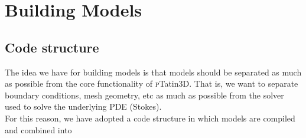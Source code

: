 \documentclass[paper=a4, fontsize=11pt,twoside]{scrartcl}
\newcommand{\ptat}{{{\textsc pTatin3D}}}
\begin{document}
\newpage
\section{Building Models}

\subsection{Code structure}
The idea we have for building models is that models should be separated as much as possible
from the core functionality of {\ptat}. That is, we want to separate boundary conditions,
mesh geometry, etc as much as possible from the solver used to solve the underlying PDE (Stokes).
\\[8pt]
For this reason, we have adopted a code structure in which models are compiled and combined into
\end{document}
